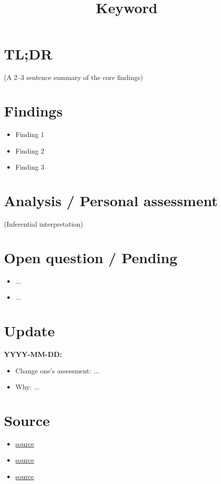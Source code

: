 \documentclass{researchlog}
\title{Keyword}
\author{}
\date{}
\begin{document}
\maketitle
\vspace{-2.5em}


\section{TL;DR}

(A 2--3 sentence summary of the core findings)

\section{Findings}

\begin{itemize}[leftmargin=*]
    \item Finding 1
    \item Finding 2
    \item Finding 3
\end{itemize}

\section{Analysis / Personal assessment}

(Inferential interpretation)

\section{Open question / Pending}

\begin{itemize}[leftmargin=*]
    \item ...
    \item ...
\end{itemize}

\section{Update}

\textbf{YYYY-MM-DD:}

\begin{itemize}[leftmargin=*]
    \item Change one's assessment: ...
    \item Why: ...
\end{itemize}

\section{Source}

\begin{itemize}[leftmargin=*]
    \item \href{link}{source}
    \item \href{link}{source}
    \item \href{link}{source}
\end{itemize}
\end{document}
